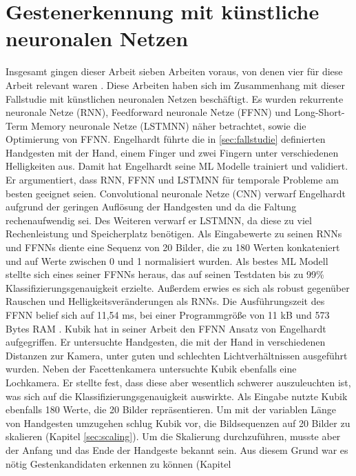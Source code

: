 \section{Gestenerkennung mit künstliche neuronalen Netzen}
Insgesamt gingen dieser Arbeit sieben Arbeiten voraus, von denen vier für diese Arbeit relevant waren \cite{engelhardtThesis, kubikThesis, klischThesis, gieseThesis}.
Diese Arbeiten haben sich im Zusammenhang mit dieser Fallstudie mit künstlichen neuronalen Netzen beschäftigt. Es wurden rekurrente neuronale Netze (RNN), Feedforward neuronale Netze (FFNN) und
Long-Short-Term Memory neuronale Netze (LSTMNN) näher betrachtet, sowie die Optimierung von FFNN.
\newline
\newline
Engelhardt führte die in \ref{sec:fallstudie} definierten Handgesten mit der Hand, einem Finger und zwei Fingern unter verschiedenen Helligkeiten aus. Damit hat Engelhardt seine ML Modelle trainiert und validiert. Er
argumentiert, dass RNN, FFNN und LSTMNN für temporale Probleme am besten geeignet seien. Convolutional neuronale
Netze (CNN) verwarf Engelhardt aufgrund der geringen Auflösung der Handgesten und da die Faltung rechenaufwendig sei. Des Weiteren verwarf er LSTMNN, da diese zu viel Rechenleistung und Speicherplatz
benötigen. Als Eingabewerte zu seinen RNNs und FFNNs diente eine Sequenz von 20 Bilder, die zu 180 Werten konkateniert und auf Werte zwischen 0 und 1 normalisiert wurden. Als bestes ML Modell stellte sich eines
seiner FFNNs heraus, das auf seinen Testdaten bis zu 99\% Klassifizierungsgenauigkeit erzielte. Außerdem erwies es sich als robust gegenüber Rauschen und Helligkeitsveränderungen als RNNs. Die Ausführungszeit
des FFNN belief sich auf 11,54 ms, bei einer Programmgröße von 11 kB und 573 Bytes RAM \cite{engelhardtThesis}.
\newline
\newline
Kubik hat in seiner Arbeit den FFNN Ansatz von Engelhardt aufgegriffen. Er untersuchte Handgesten, die mit der Hand in verschiedenen Distanzen zur Kamera, unter guten und schlechten Lichtverhältnissen ausgeführt wurden.
Neben der Facettenkamera untersuchte Kubik ebenfalls eine Lochkamera. Er stellte fest, dass diese aber wesentlich schwerer auszuleuchten ist, was sich auf die
Klassifizierungsgenauigkeit auswirkte. Als Eingabe nutzte Kubik ebenfalls 180 Werte, die 20 Bilder repräsentieren. Um mit der variablen Länge von Handgesten umzugehen schlug Kubik vor, die Bildsequenzen auf 20 Bilder zu
skalieren (Kapitel \ref{sec:scaling}). Um die Skalierung durchzuführen, musste aber der Anfang und das Ende der Handgeste bekannt sein. Aus diesem Grund war es nötig Gestenkandidaten erkennen zu können (Kapitel
